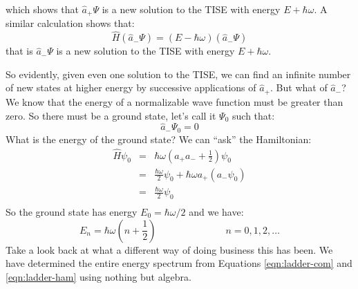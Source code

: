 \documentclass[12pt]{book}
\begin{document}
which shows that $\hat{a}_+ \Psi$ is a new solution to the TISE with energy $E+\hbar\omega$.  A similar calculation shows that:
$$\hat{H} \left(\hat{a}_-\Psi\right) = \left( E - \hbar \omega \right) \left(\hat{a}_-\Psi\right)$$
that is $\hat{a}_- \Psi$ is a new solution to the TISE with energy $E+\hbar\omega$.

So evidently, given even one solution to the TISE, we can find an infinite number of new states at higher energy by successive applications of $\hat{a}_+$.  But what of $\hat{a}_-$?  We know that the energy of a normalizable wave function must be greater than zero.  So there must be a ground state, let's call it $\Psi_0$ such that:
\begin{equation}
\hat{a}_- \Psi_0 = 0
\end{equation}
What is the energy of the ground state?  We can ``ask'' the Hamiltonian:
\begin{eqnarray*}
\hat{H} \psi_0 &=& \hbar\omega \left( a_+ a_- + \frac{1}{2} \right) \psi_0 \\
&=& \frac{\hbar\omega}{2}\psi_0 + \hbar\omega a_+ \left( a_- \psi_0 \right)\\
&=& \frac{\hbar\omega}{2}\psi_0\\
\end{eqnarray*}
So the ground state has energy $E_0 = \hbar\omega/2$ and we have:
\begin{equation}
E_n = \hbar \omega \left(n + \frac{1}{2} \right) \hspace{3cm} n = 0,1,2,\ldots
\end{equation}
Take a look back at what a different way of doing business this has been.  We have determined the entire energy spectrum from Equations \ref{eqn:ladder-com} and \ref{eqn:ladder-ham} using nothing but  algebra.
\end{document}
